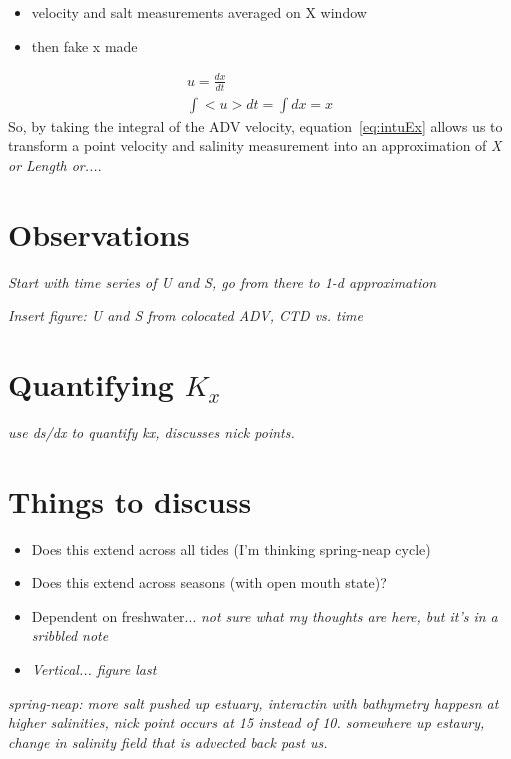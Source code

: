 \begin{itemize} \item{velocity and salt measurements averaged on X window} \item{then fake x made} \end{itemize}

\begin{eqnarray}
u = \frac{dx}{dt} \label{eq:uEdxdt}\\
\int{<u>dt} = \int{dx} = x \label{eq:intuEx}
\end{eqnarray}
So, by taking the integral of the ADV velocity, equation~\ref{eq:intuEx} allows us to transform a point velocity and salinity measurement into an approximation of \emph{X or Length or...}. 




\section{Observations}
\emph{Start with time series of U and S, go from there to 1-d approximation}

\emph{Insert figure: U and S from colocated ADV, CTD vs. time}



\section{Quantifying $K_x$}
\emph{use ds/dx to quantify kx, discusses nick points.}
\section{Things to discuss}
\begin{itemize}
	\item Does this extend across all tides (I'm thinking spring-neap cycle)
	\item Does this extend across seasons (with open mouth state)?
	\item Dependent on freshwater... \emph{not sure what my thoughts are here, but it's in a sribbled note}
	\item \emph{Vertical... figure last}
\end{itemize}



\emph{spring-neap:
more salt pushed up estuary, interactin with bathymetry happesn at higher salinities, nick point occurs at 15 instead of 10. somewhere up estaury, change in salinity field that is advected back past us. }

